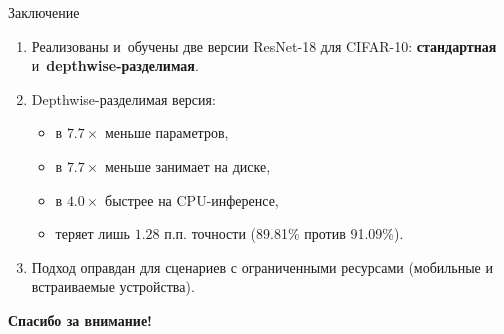 \documentclass[11pt,aspectratio=169]{beamer}
\begin{document}
\begin{frame}{Заключение}
  \begin{enumerate}
    \item Реализованы и~обучены две версии ResNet-18 для CIFAR-10:
          \textbf{стандартная} и~\textbf{depthwise-разделимая}.
    \item Depthwise-разделимая версия:
          \begin{itemize}
            \item в \(7.7\times\) меньше параметров,
            \item в \(7.7\times\) меньше занимает на диске,
            \item в \(4.0\times\) быстрее на CPU-инференсе,
            \item теряет лишь \(1.28\) п.п. точности (89.81\% против 91.09\%).
          \end{itemize}
    \item Подход оправдан для сценариев с ограниченными ресурсами
          (мобильные и встраиваемые устройства).
  \end{enumerate}

  \vspace{10pt}
  \begin{center}
    \large\textbf{Спасибо за внимание!}
  \end{center}
\end{frame}

\end{document}
